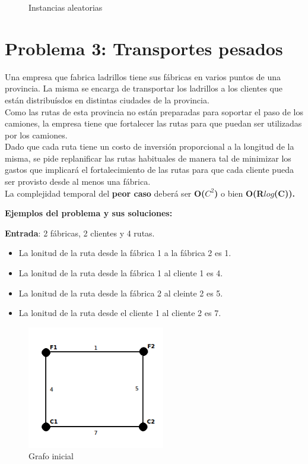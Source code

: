 \documentclass[a4paper, 10pt, twoside]{article}
\newcommand{\dosgraficos}[2]{
    \newcommand{\separacion}{-2.2em}
    \vspace{\separacion}
    
    \vspace{\separacion}
    
}
\begin{document}
\begin{figure}[H]
  \centering
  \dosgraficos{problema2-instancias-aleatorias}
              {problema2-instancias-aleatorias-n}
  \caption{Instancias aleatorias}
\end{figure}





\newpage

\section{Problema 3: Transportes pesados}

Una empresa que fabrica ladrillos tiene sus fábricas en varios puntos de una provincia. La misma se encarga de transportar los ladrillos a los clientes que están distribuísdos en distintas ciudades de la provincia.\\
Como las rutas de esta provincia no están preparadas para soportar el paso de los camiones, la empresa tiene que fortalecer las rutas para que puedan ser utilizadas por los camiones.\\
Dado que cada ruta tiene un costo de inversión proporcional a la longitud de la misma, se pide replanificar las rutas habituales de manera tal de minimizar los gastos que implicará el fortalecimiento de las rutas para que cada cliente pueda ser provisto desde al menos una fábrica.\\
La complejidad temporal del \textbf{peor caso} deberá ser \textbf{O($C^2$)} o bien \textbf{O(R$log$(C)).}

\textbf{Ejemplos del problema y sus soluciones:}

\textbf{Entrada}: 2 fábricas, 2 clientes y 4 rutas.
\begin{itemize}
\item{La lonitud de la ruta desde la fábrica 1 a la fábrica 2 es 1.}
\item{La lonitud de la ruta desde la fábrica 1 al cliente 1 es 4.}
\item{La lonitud de la ruta desde la fábrica 2 al cleinte 2 es 5.}
\item{La lonitud de la ruta desde el cliente 1 al cliente 2 es 7.}
\end{itemize}

\begin{figure}[ht!]
\centering
\includegraphics[width=60mm]{../ejemplo_graficos/CosoDosSubconjuntos.png}
\caption{Grafo inicial}
\label{1}
\end{figure} 
\end{document}
